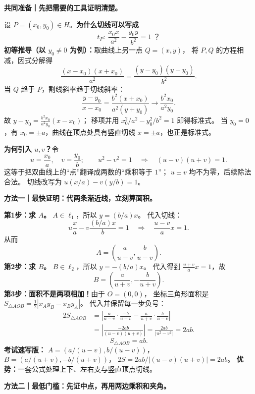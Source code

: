 \clearpage
\begin{proofbox}
\textbf{共同准备｜先把需要的工具证明清楚。}

设 $P=(x_0,y_0)\in H$。\textbf{为什么切线可以写成}
\[
\boxed{t_P:\ \frac{x_0x}{a^2}-\frac{y_0y}{b^2}=1}\;\text{？}
\]
\textbf{初等推导（以 $y_0\ne0$ 为例）：}取曲线上另一点 $Q=(x,y)$，
将 $P,Q$ 的方程相减，因式分解得
\[
\frac{(x-x_0)(x+x_0)}{a^2}
=\frac{(y-y_0)(y+y_0)}{b^2}.
\]
当 $Q$ 趋于 $P$，割线斜率趋于切线斜率：
\[
\frac{y-y_0}{x-x_0}
=\frac{b^2(x+x_0)}{a^2(y+y_0)}
\longrightarrow\frac{b^2x_0}{a^2y_0}.
\]
故 $y-y_0=\frac{b^2x_0}{a^2y_0}(x-x_0)$；
移项并用 $x_0^2/a^2-y_0^2/b^2=1$ 即得标准式。
当 $y_0=0$，有 $x_0=\pm a$，曲线在顶点处具有竖直切线
$x=\pm a$，也正是标准式。

\textbf{为何引入 $u,v$？}令
\[
u=\frac{x_0}{a},\quad v=\frac{y_0}{b};\qquad
u^2-v^2=1\quad\Rightarrow\quad (u-v)(u+v)=1.
\]
这等于把双曲线上的``点''翻译成两数的``乘积等于 $1$''；
$u\pm v$ 均不为零，后续除法合法。
切线改写为 $u(x/a)-v(y/b)=1$。

\medskip
\textbf{方法一｜最快证明：代两条渐近线，立刻算面积。}
\begin{center}

\end{center}

\textbf{第1步：求 $A$。} $A\in\ell_1$，所以 $y=(b/a)x$。
代入切线：
\[
u\frac xa-v\frac{(b/a)x}{b}=1
\quad\Longrightarrow\quad \frac{u-v}{a}x=1.
\]
从而
\[
\boxed{A=\left(\frac{a}{u-v},\frac{b}{u-v}\right)}.
\]
\textbf{第2步：求 $B$。} $B\in\ell_2$，所以 $y=-(b/a)x$。
代入得到 $\frac{u+v}{a}x=1$，故
\[
\boxed{B=\left(\frac{a}{u+v},-\frac{b}{u+v}\right)}.
\]
\textbf{第3步：面积不是两项相加！}由于 $O=(0,0)$，
坐标三角形面积是
$S_{\triangle AOB}=\frac12|x_Ay_B-x_By_A|$。
代入并保留每一步负号：
\[
\begin{aligned}
2S_{\triangle AOB}
&=\left|\frac a{u-v}\cdot\frac{-b}{u+v}
-\frac a{u+v}\cdot\frac b{u-v}\right|\\
&=\left|\frac{-2ab}{(u-v)(u+v)}\right|
=\frac{2ab}{|u^2-v^2|}=2ab.
\end{aligned}
\]
\[
\boxed{S_{\triangle AOB}=ab}.
\]
\textbf{考试速写版：}
$A=(a/(u-v),b/(u-v))$，$B=(a/(u+v),-b/(u+v))$，
$2S=2ab/|(u-v)(u+v)|=2ab$。
\textbf{优势：}一套公式处理上下、左右支与竖直顶点切线。

\medskip
\textbf{方法二｜最低门槛：先证中点，再用两边乘积和夹角。}
\begin{center}

\end{center}


\end{proofbox}
